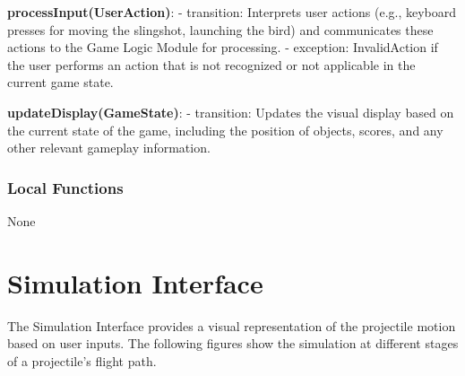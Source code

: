 \documentclass[12pt]{article}
\begin{document}
\textbf{processInput(UserAction)}:
- transition: Interprets user actions (e.g., keyboard presses for moving the slingshot, launching the bird) and communicates these actions to the Game Logic Module for processing.
- exception: InvalidAction if the user performs an action that is not recognized or not applicable in the current game state.

\textbf{updateDisplay(GameState)}:
- transition: Updates the visual display based on the current state of the game, including the position of objects, scores, and any other relevant gameplay information.

\subsubsection{Local Functions}

None

\section{Simulation Interface}
The Simulation Interface provides a visual representation of the projectile motion based on user inputs. The following figures show the simulation at different stages of a projectile's flight path.

\end{document}
